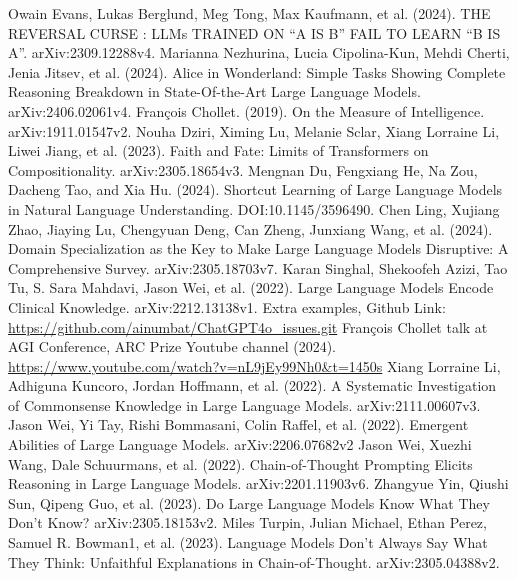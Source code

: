 \documentclass[11pt]{scrartcl}
\begin{document}
\begin{thebibliography}{14}  %

	Owain Evans, Lukas Berglund, Meg Tong, Max Kaufmann, et al. (2024). THE REVERSAL CURSE : LLMs TRAINED ON “A IS B” FAIL TO LEARN “B IS A”. arXiv:2309.12288v4.      
    Marianna Nezhurina, Lucia Cipolina-Kun, Mehdi Cherti, Jenia Jitsev, et al. (2024). Alice in Wonderland: Simple Tasks Showing Complete Reasoning Breakdown in State-Of-the-Art Large Language Models. arXiv:2406.02061v4.
    François Chollet. (2019). On the Measure of Intelligence. arXiv:1911.01547v2.
    Nouha Dziri, Ximing Lu, Melanie Sclar, Xiang Lorraine Li, Liwei Jiang, et al. (2023). Faith and Fate: Limits of Transformers on Compositionality. arXiv:2305.18654v3.
    Mengnan Du, Fengxiang He, Na Zou, Dacheng Tao, and Xia Hu. (2024). Shortcut Learning of Large Language Models in Natural Language Understanding. DOI:10.1145/3596490.
    Chen Ling, Xujiang Zhao, Jiaying Lu, Chengyuan Deng, Can Zheng, Junxiang Wang, et al. (2024). Domain Specialization as the Key to Make Large Language Models Disruptive: A Comprehensive Survey. arXiv:2305.18703v7.
	Karan Singhal, Shekoofeh Azizi, Tao Tu, S. Sara Mahdavi, Jason Wei, et al. (2022). Large Language Models Encode Clinical Knowledge. arXiv:2212.13138v1.
	Extra examples, Github Link: \url{https://github.com/ainumbat/ChatGPT4o_issues.git}
	François Chollet talk at AGI Conference, ARC Prize Youtube channel (2024). \url{https://www.youtube.com/watch?v=nL9jEy99Nh0&t=1450s}
	Xiang Lorraine Li, Adhiguna Kuncoro, Jordan Hoffmann, et al. (2022). A Systematic Investigation of Commonsense Knowledge in Large Language Models. arXiv:2111.00607v3.
	Jason Wei, Yi Tay, Rishi Bommasani, Colin Raffel, et al. (2022). Emergent Abilities of Large Language Models. arXiv:2206.07682v2 
	Jason Wei, Xuezhi Wang, Dale Schuurmans, et al. (2022). Chain-of-Thought Prompting Elicits Reasoning in Large Language Models. arXiv:2201.11903v6.     
	Zhangyue Yin, Qiushi Sun, Qipeng Guo, et al. (2023). Do Large Language Models Know What They Don’t Know? arXiv:2305.18153v2.
    Miles Turpin, Julian Michael, Ethan Perez, Samuel R. Bowman1, et al. (2023). Language Models Don’t Always Say What They Think: Unfaithful Explanations in Chain-of-Thought. arXiv:2305.04388v2. 

\end{thebibliography}
\end{document}
